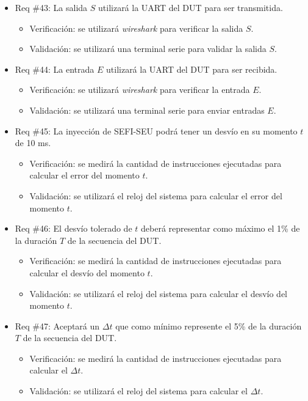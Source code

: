 \documentclass[
11pt, %
]{charter}
\begin{document}
\begin{itemize}
\item Req \#43: La salida $ S $ utilizará la UART del DUT para ser transmitida.
\begin{itemize}
    \item Verificación: se utilizará \emph{wireshark} para verificar la salida $ S $.
    \item Validación: se utilizará una terminal serie para validar la salida $ S $.
\end{itemize}

\item Req \#44: La entrada $ E $ utilizará la UART del DUT para ser recibida.
\begin{itemize}
    \item Verificación: se utilizará \emph{wireshark} para verificar la entrada $ E $.
    \item Validación: se utilizará una terminal serie para enviar entradas $ E $.
\end{itemize}

\item Req \#45: La inyección de SEFI-SEU podrá tener un desvío en su momento $ t $ de 10 ms.
\begin{itemize}
    \item Verificación: se medirá la cantidad de instrucciones ejecutadas para calcular el error del momento $ t $.
    \item Validación: se utilizará el reloj del sistema para calcular el error del momento $ t $.
\end{itemize}

\item Req \#46: El desvío tolerado de $ t $ deberá representar como máximo el 1\% de la duración $ T $ de la secuencia del DUT.
\begin{itemize}
    \item Verificación: se medirá la cantidad de instrucciones ejecutadas para calcular el desvío del momento $ t $.
    \item Validación: se utilizará el reloj del sistema para calcular el desvío del momento $ t $.
\end{itemize}

\item Req \#47: Aceptará un $ \Delta t $ que como mínimo represente el 5\% de la duración $ T $ de la secuencia del DUT.
\begin{itemize}
    \item Verificación: se medirá la cantidad de instrucciones ejecutadas para calcular el $ \Delta t $.
    \item Validación: se utilizará el reloj del sistema para calcular el $ \Delta t $.
\end{itemize}


\end{itemize}
\end{document}
